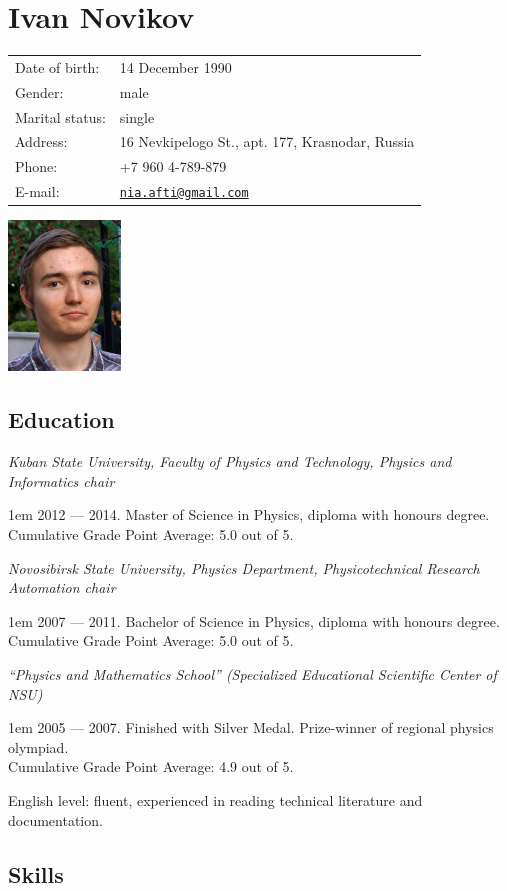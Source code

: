 \documentclass[a4paper, 12pt]{article}
\author{\theauthor}
\title{\thetitle}
\makeatletter
\newenvironment{fieldset}%
    {\begin{tabular}{ll}}%
    {\end{tabular}}
\newcommand{\field}[2]{ #1: & #2 \\ }
\newenvironment{indented}%
    { \begingroup %
        \noindent %
        \leftskip1em}%
    { \par\endgroup }
\newcommand{\education}[4]{
    \par\emph{#1}

    \begin{indented}
      #2. #3\\
      Cumulative Grade Point Average: #4 out of 5.
    \end{indented}
    \vspace{1mm} %
  }
\newcommand{\theauthor}{Ivan Novikov}
\newcommand{\themail}{nia.afti@gmail.com}
\makeatother
\begin{document}
  \begin{minipage}[h]{0.8\linewidth}
    \section*{\theauthor}

    \begin{fieldset}
      \field{Date of birth} {14 December 1990}
      \field{Gender}        {male}
      \field{Marital status}{single}
      \field{Address}       {16 Nevkipelogo St., apt. 177, Krasnodar, Russia}
      \field{Phone}         {+7 960 4-789-879}
      \field{E-mail}        {\href{mailto:\themail}{\nolinkurl{\themail}}}
    \end{fieldset}
  \end{minipage}
  \begin{minipage}[h]{0.19\linewidth}
    \includegraphics[width=3cm]{photo}
  \end{minipage}

  \subsection*{Education}

  \education{Kuban State University, Faculty of Physics and Technology, Physics and Informatics chair}
            {2012 — 2014}{Master of Science in Physics, diploma with honours degree.}{5.0}
  \education{Novosibirsk State University, Physics Department, Physicotechnical Research Automation chair}
            {2007 — 2011}{Bachelor of Science in Physics, diploma with honours degree.}{5.0}
  \education{``Physics and Mathematics School'' (Specialized Educational Scientific Center of NSU)}
            {2005 — 2007}{Finished with Silver Medal. Prize-winner of regional physics olympiad.}{4.9}

  English level: fluent, experienced in reading technical literature and documentation.

  \subsection*{Skills}
\end{document}

